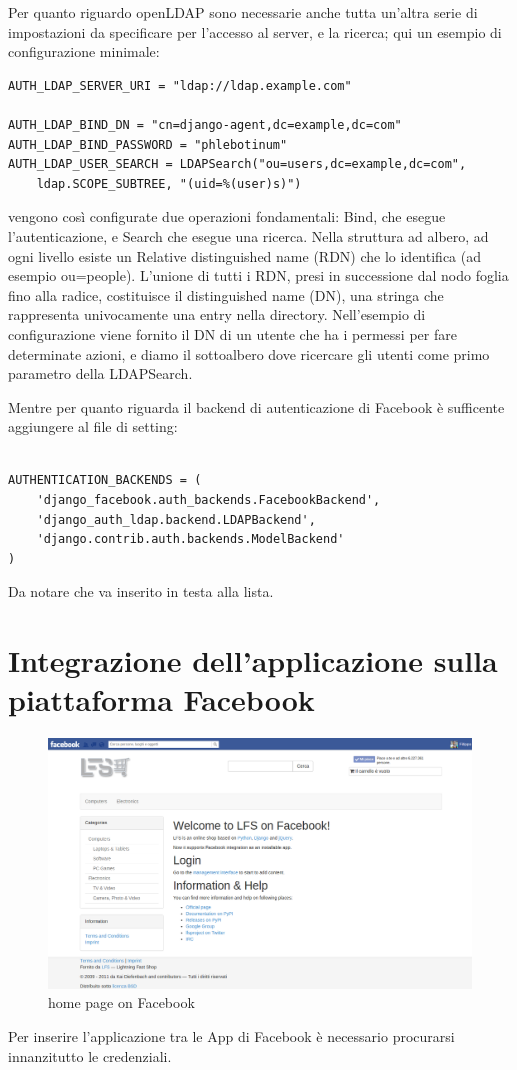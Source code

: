 Per quanto riguardo openLDAP sono necessarie anche tutta un'altra serie di impostazioni da specificare per l'accesso al server, e la ricerca; qui un esempio di configurazione minimale:
\begin{lstlisting}
AUTH_LDAP_SERVER_URI = "ldap://ldap.example.com"

AUTH_LDAP_BIND_DN = "cn=django-agent,dc=example,dc=com"
AUTH_LDAP_BIND_PASSWORD = "phlebotinum"
AUTH_LDAP_USER_SEARCH = LDAPSearch("ou=users,dc=example,dc=com",
    ldap.SCOPE_SUBTREE, "(uid=%(user)s)")
\end{lstlisting}
vengono così configurate  due operazioni fondamentali: Bind, che esegue l'autenticazione, e Search che esegue una ricerca. Nella struttura ad albero, ad ogni livello esiste un Relative distinguished name (RDN) che lo identifica (ad esempio ou=people). L'unione di tutti i RDN, presi in successione dal nodo foglia fino alla radice, costituisce il distinguished name (DN), una stringa che rappresenta univocamente una entry nella directory. Nell'esempio di configurazione viene fornito il DN di un utente che ha i permessi per fare determinate azioni, e diamo il sottoalbero dove ricercare gli utenti come primo parametro della LDAPSearch.
 
Mentre per quanto riguarda il backend di autenticazione di Facebook è sufficente aggiungere al file di setting:

\begin{lstlisting}

AUTHENTICATION_BACKENDS = (
	'django_facebook.auth_backends.FacebookBackend',
	'django_auth_ldap.backend.LDAPBackend',
	'django.contrib.auth.backends.ModelBackend'
)

\end{lstlisting}

Da notare che va inserito in testa alla lista.

\newpage 
\section{Integrazione dell'applicazione sulla piattaforma Facebook}
\begin{figure}
\centering
\includegraphics[width=0.9\columnwidth]{img/main_page}
\caption{home page on Facebook}
\end{figure}
Per inserire l'applicazione tra le App di Facebook è necessario procurarsi innanzitutto le credenziali.

